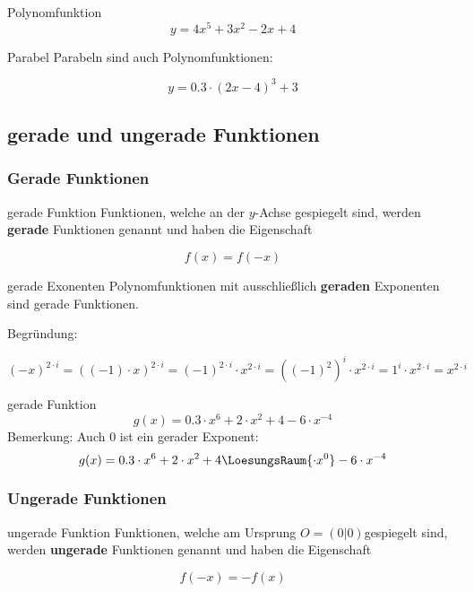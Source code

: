 \begin{beispiel}{Polynomfunktion}{}
  $$y=4x^5 + 3x^2 -2x + 4$$
\end{beispiel}

\begin{bemerkung}{Parabel}{}
  Parabeln sind auch Polynomfunktionen:

  $$y  = 0.3\cdot{}(2x-4)^3 + 3$$
  
\end{bemerkung}
\newpage

\subsection{gerade und ungerade Funktionen}
\subsubsection{Gerade Funktionen}

\begin{definition}{gerade Funktion}{}
  Funktionen, welche an der $y$-Achse gespiegelt sind, werden
  \textbf{gerade} Funktionen genannt und haben die Eigenschaft

  $$f(x) = f(-x)$$
\end{definition}


\begin{gesetz}{gerade Exonenten}{}
  Polynomfunktionen mit ausschließlich \textbf{geraden} Exponenten sind gerade Funktionen.

  Begründung:

  $$(-x)^{2\cdot{}i} = ((-1)\cdot{}x)^{2\cdot{}i} = (-1)^{2\cdot{}i} \cdot{} x^{2\cdot{}i} = \left((-1)^2\right)^i \cdot{} x^{2\cdot{}i} = 1^i\cdot{}x^{2\cdot{}i} = x^{2\cdot{}i}$$
\end{gesetz}

\begin{beispiel}{gerade Funktion}{}
  $$g(x) = 0.3\cdot{}x^6 + 2\cdot{}x^2 + 4 -6\cdot{}x^{-4}$$
  Bemerkung: Auch $0$ ist ein gerader Exponent:
  $$g(x) = 0.3\cdot{}x^6 + 2\cdot{}x^2 + 4\LoesungsRaum{\cdot{}x^0} -6\cdot{}x^{-4}$$  
\end{beispiel}
\newpage
\subsubsection{Ungerade Funktionen}
\begin{definition}{ungerade Funktion}{}
  Funktionen, welche am Ursprung $O = (0|0)$gespiegelt sind, werden
  \textbf{ungerade} Funktionen genannt und haben die Eigenschaft

  $$f(-x) = -f(x)$$
\end{definition}




